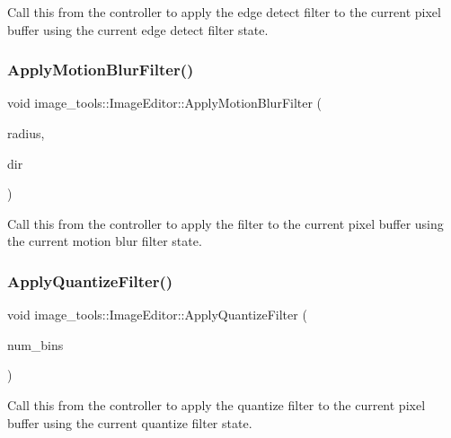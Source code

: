 Call this from the controller to apply the edge detect filter to the current pixel buffer using the current edge detect filter state. \mbox{\label{classimage__tools_1_1ImageEditor_aaf09cb82f92d3d78583b631ac2ca2809}} 
\subsubsection{\texorpdfstring{Apply\+Motion\+Blur\+Filter()}{ApplyMotionBlurFilter()}}
{\footnotesize\ttfamily void image\+\_\+tools\+::\+Image\+Editor\+::\+Apply\+Motion\+Blur\+Filter (\begin{DoxyParamCaption}\item[{float}]{radius,  }\item[{\hyperlink{classimage__tools_1_1ImageEditor_a20bacf2756f1b97eed82d2fee9628ac2}{M\+Blur\+Dir}}]{dir }\end{DoxyParamCaption})}

Call this from the controller to apply the filter to the current pixel buffer using the current motion blur filter state. \mbox{\label{classimage__tools_1_1ImageEditor_af7f5752ea941a7909f0274a6e60032ee}} 
\subsubsection{\texorpdfstring{Apply\+Quantize\+Filter()}{ApplyQuantizeFilter()}}
{\footnotesize\ttfamily void image\+\_\+tools\+::\+Image\+Editor\+::\+Apply\+Quantize\+Filter (\begin{DoxyParamCaption}\item[{int}]{num\+\_\+bins }\end{DoxyParamCaption})}

Call this from the controller to apply the quantize filter to the current pixel buffer using the current quantize filter state. \mbox{\label{classimage__tools_1_1ImageEditor_ae63df2a76403031054f608a60f5c87d3}} 

